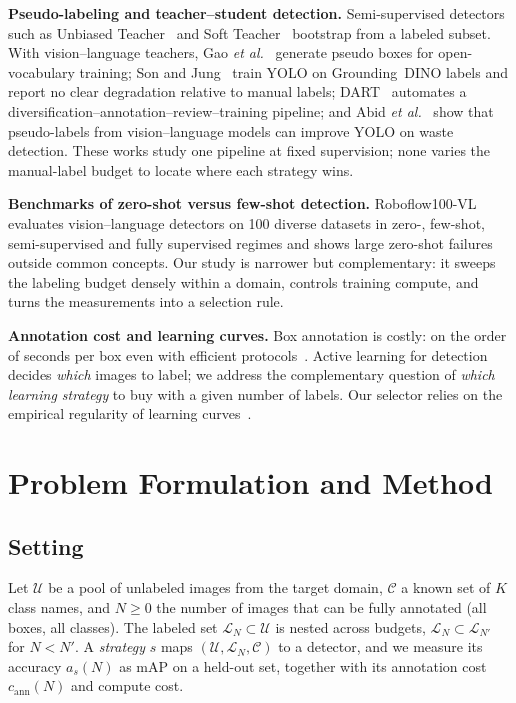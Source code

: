 \documentclass[conference]{IEEEtran}
\begin{document}
\textbf{Pseudo-labeling and teacher--student detection.} Semi-supervised detectors such as Unbiased Teacher~\cite{liu2021unbiased} and Soft Teacher~\cite{xu2021softteacher} bootstrap from a labeled subset. With vision--language teachers, Gao \emph{et al.}~\cite{gao2022pseudobox} generate pseudo boxes for open-vocabulary training; Son and Jung~\cite{son2024teacherstudent} train YOLO on Grounding~DINO labels and report no clear degradation relative to manual labels; DART~\cite{xin2024dart} automates a diversification--annotation--review--training pipeline; and Abid \emph{et al.}~\cite{abid2025waste} show that pseudo-labels from vision--language models can improve YOLO on waste detection. These works study one pipeline at fixed supervision; none varies the manual-label budget to locate where each strategy wins.

\textbf{Benchmarks of zero-shot versus few-shot detection.} Roboflow100-VL~\cite{robicheaux2025rf100vl} evaluates vision--language detectors on 100 diverse datasets in zero-, few-shot, semi-supervised and fully supervised regimes and shows large zero-shot failures outside common concepts. Our study is narrower but complementary: it sweeps the labeling budget densely within a domain, controls training compute, and turns the measurements into a selection rule.

\textbf{Annotation cost and learning curves.} Box annotation is costly: on the order of seconds per box even with efficient protocols~\cite{su2012crowdsourcing,papadopoulos2017extreme}. Active learning for detection~\cite{brust2018active} decides \emph{which} images to label; we address the complementary question of \emph{which learning strategy} to buy with a given number of labels. Our selector relies on the empirical regularity of learning curves~\cite{cortes1993curves,hestness2017scaling}.
\section{Problem Formulation and Method}
\subsection{Setting}
Let $\mathcal{U}$ be a pool of unlabeled images from the target domain, $\mathcal{C}$ a known set of $K$ class names, and $N\ge 0$ the number of images that can be fully annotated (all boxes, all classes). The labeled set $\mathcal{L}_N\subset\mathcal{U}$ is nested across budgets, $\mathcal{L}_{N}\subset\mathcal{L}_{N'}$ for $N<N'$. A \emph{strategy} $s$ maps $(\mathcal{U},\mathcal{L}_N,\mathcal{C})$ to a detector, and we measure its accuracy $a_s(N)$ as mAP on a held-out set, together with its annotation cost $c_{\text{ann}}(N)$ and compute cost.
\end{document}
